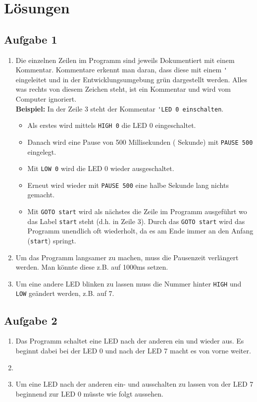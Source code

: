 \section{Lösungen}


\ifteacher
\subsection{Aufgabe 1}
\begin{enumerate}[label=(\alph*)]
	\item Die einzelnen Zeilen im Programm sind jeweils Dokumentiert
	mit einem Kommentar. Kommentare erkennt man daran, dass diese mit
	einem \lstinline{'} eingeleitet und in der Entwicklungsumgebung
	grün dargestellt werden. Alles was rechts von diesem 
	Zeichen steht, ist ein Kommentar und wird vom Computer ignoriert.\\
	\textbf{Beispiel:} In der Zeile 3 steht der Kommentar 
	\lstinline{'LED 0 einschalten}.
	\begin{itemize}
		\item Als erstes wird mittels \lstinline{HIGH 0} die LED 0 
		eingeschaltet.
		\item Danach wird eine Pause von 500 Millisekunden 
		( Sekunde) mit \lstinline{PAUSE 500} eingelegt.
		\item Mit \lstinline{LOW 0} wird die LED 0 wieder ausgeschaltet.
		\item Erneut wird wieder mit \lstinline{PAUSE 500} eine halbe
		Sekunde lang nichts gemacht.
		\item Mit \lstinline{GOTO start} wird als nächstes die Zeile
		im Programm ausgeführt wo das Label \lstinline{start} steht
		(d.h. in Zeile 3). Durch das \lstinline{GOTO start} wird das
		Programm unendlich oft wiederholt, da es am Ende immer an den
		Anfang (\lstinline{start}) springt.
	\end{itemize}
	\item Um das Programm langsamer zu machen, muss die Pausenzeit
	verlängert werden. Man könnte diese z.B. auf 1000ms setzen.
	
	\item Um eine andere LED blinken zu lassen muss die Nummer hinter 
	\lstinline{HIGH} und \lstinline{LOW} geändert werden, z.B. auf 7.
	
\end{enumerate}
\fi

\ifteacher
\newpage
\subsection{Aufgabe 2}
\begin{enumerate}[label=(\alph*)]
	\item Das Programm schaltet eine LED nach der anderen ein und wieder
	aus. Es beginnt dabei bei der LED 0 und nach der LED 7 macht es von
	vorne weiter.
	\item ~
	\item Um eine LED nach der anderen ein- und ausschalten zu lassen 
	von der LED 7 beginnend zur LED 0 müsste wie folgt aussehen.
	
\end{enumerate}
\fi

